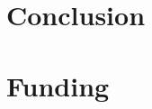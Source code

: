 \documentclass[twocolumn, 8pt]{article}
\begin{document}
\section*{Conclusion}
\lipsum[3-4]

\section*{Funding}
\lipsum[3-4]


{\footnotesize }
\end{document}
